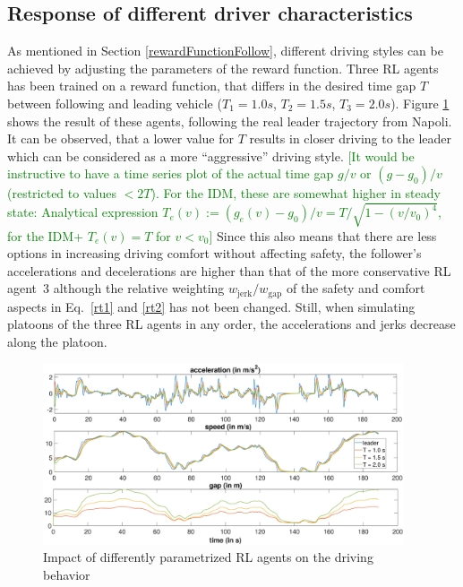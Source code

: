 \documentclass[review]{elsarticle}
\providecommand{\green}[1]{\textcolor{green}{#1}}
\providecommand{\martinc}[1]{\green{[#1]}} %
\providecommand{\sub}[1]{_{\mathrm{#1}}}  %
\providecommand{\3}{{\ss}}
\begin{document}
\subsection{Response of different driver characteristics}
\label{sec:differentT}

As mentioned in Section \ref{rewardFunctionFollow}, different driving styles
can be achieved by adjusting the parameters of the reward
function. Three RL agents has been trained on a reward function, that
differs in the desired time gap $T$ between following and
leading vehicle ($T_{1} = 1.0s$, $T_{2} = 1.5s$, 
$T_{3} =2.0s$). Figure \ref{fig:differentT} shows the result of these agents,
following the real leader trajectory from Napoli. It can be observed,
that a lower value for $T$ results in closer driving to the
leader which can be considered as a more ``aggressive''
driving style. \martinc{It would be instructive to have a time series
  plot of the actual time gap $g/v$ or $(g-g_0)/v$ (restricted to
  values $<2T$). For the IDM, these
  are somewhat higher in steady state: Analytical expression 
$T_e(v):=(g_e(v)-g_0)/v=T/\sqrt{1-(v/v_0)^4}$, for the IDM+ $T_e(v)=T$
  for $v<v_0$}
Since this also means that there are less options in
increasing driving comfort without affecting safety, the follower's
accelerations and decelerations are higher than that of the more
conservative RL agent~3 although the relative
weighting $w\sub{jerk}/w\sub{gap}$ of the safety and comfort aspects in Eq.~\eqref{rt1} and \eqref{rt2} has not been
changed. Still, when simulating platoons of the three RL
  agents in any order, the accelerations and jerks decrease along the
  platoon.

\begin{figure}
	\centering
	\includegraphics[width=0.95\textwidth]{images/differentT}
	\caption{Impact of differently parametrized RL agents
          on the driving behavior }
	\label{fig:differentT}
\end{figure}
\end{document}

